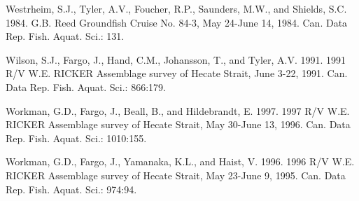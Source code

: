 \documentclass[11pt]{book}
\begin{document}
\leavevmode\hypertarget{ref-westrheim1984}{}%
Westrheim, S.J., Tyler, A.V., Foucher, R.P., Saunders, M.W., and Shields, S.C. 1984. G.B. Reed Groundfish Cruise No. 84-3, May 24-June 14, 1984. Can. Data Rep. Fish. Aquat. Sci.: 131.

\leavevmode\hypertarget{ref-wilson1991}{}%
Wilson, S.J., Fargo, J., Hand, C.M., Johansson, T., and Tyler, A.V. 1991. 1991 R/V W.E. RICKER Assemblage survey of Hecate Strait, June 3-22, 1991. Can. Data Rep. Fish. Aquat. Sci.: 866:179.

\leavevmode\hypertarget{ref-workman1997}{}%
Workman, G.D., Fargo, J., Beall, B., and Hildebrandt, E. 1997. 1997 R/V W.E. RICKER Assemblage survey of Hecate Strait, May 30-June 13, 1996. Can. Data Rep. Fish. Aquat. Sci.: 1010:155.

\leavevmode\hypertarget{ref-workman1996}{}%
Workman, G.D., Fargo, J., Yamanaka, K.L., and Haist, V. 1996. 1996 R/V W.E. RICKER Assemblage survey of Hecate Strait, May 23-June 9, 1995. Can. Data Rep. Fish. Aquat. Sci.: 974:94.

\setlength{\parindent}{0in} \setlength{\leftskip}{0in} \setlength{\parskip}{4pt}

\end{document}
